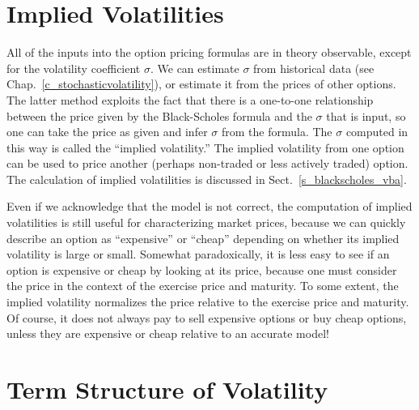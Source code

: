 \section{Implied Volatilities}\label{s_impliedvolatility}

All of the inputs into the option pricing formulas are in theory observable, except for the volatility coefficient $\sigma$.  We can estimate $\sigma$ from historical data (see Chap.~\ref{c_stochasticvolatility}), or estimate it from the prices of other options.  The latter method exploits the fact that there is a one-to-one relationship between the price given by the Black-Scholes formula and the $\sigma$ that is input, so one can take the price as given and infer $\sigma$ from the formula. The $\sigma$ computed in this way is called the ``implied volatility.''   The implied volatility from one option can be used to price another (perhaps non-traded or less actively traded) option.  The calculation of implied volatilities is discussed in Sect.~\ref{s_blackscholes_vba}.


Even if we acknowledge that the model is not correct, the computation of implied volatilities is still useful for characterizing market prices, because we can quickly describe an option as ``expensive'' or ``cheap'' depending on whether its implied volatility is large or small.  Somewhat paradoxically, it is less easy to see if an option is expensive or cheap by looking at its price, because one must consider the price in the context of the exercise price and maturity.  To some extent, the implied volatility normalizes the price relative to the exercise price and maturity.  Of course, it does not always pay to sell expensive options or buy cheap options, unless they are expensive or cheap relative to an accurate model!



\section{Term Structure of Volatility}\label{s_timevaryingvolatility}

